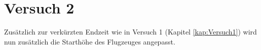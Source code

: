 %















\newpage
\section{Versuch 2}\label{kap:Versuch2}
Zusätzlich zur verkürzten Endzeit wie in Versuch 1 (Kapitel \ref{kap:Versuch1}) wird nun zusätzlich die Starthöhe des Flugzeuges angepasst.

